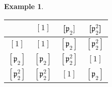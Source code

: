 \documentclass[11pt,a4paper]{report}
\theoremstyle{plain}
\theoremstyle{definition}
\newtheorem{exmp}[subsection]{Example}
\theoremstyle{definition}
\def\gothp{\mathfrak{p}}
\begin{document}
\begin{exmp}
		
		
		
		
		\begin{center}
			\begin{tabular} {|c| c c c |}
				\hline
				&$[1]$&[$\gothp_2]$&[$\gothp_2^2$]\\
				\hline
				$[1]$&$[1]$&$[\gothp_2]$&$[\gothp_2^2]$\\
				$[\gothp_2]$&$[\gothp_2] $& $[\gothp_2^2]$&$[1]$\\
				$[\gothp_2^2]$&$[\gothp_2^2]$&$[1]$&$[\gothp_2]$\\
				\hline
			\end{tabular}
		\end{center}
		
		
		
	\end{exmp}
	
\end{document}
